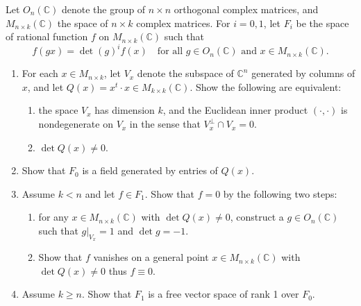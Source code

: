 \begin{exercise}
\label{algebra:2015:2}
Let $O_n(\mathbb{C})$ denote the group of $n \times n$ orthogonal complex matrices, and $M_{n \times k}(\mathbb{C})$ the space of $n \times k$ complex matrices. For $i = 0, 1$, let $F_i$ be the space of rational function $f$ on $M_{n \times k}(\mathbb{C})$ such that
\[
f(gx) = \det(g)^i f(x) \quad \text{for all } g \in O_n(\mathbb{C}) \text{ and } x \in M_{n \times k}(\mathbb{C}).
\]
\begin{enumerate}
    \item For each $x \in M_{n \times k}$, let $V_x$ denote the subspace of $\mathbb{C}^n$ generated by columns of $x$, and let $Q(x) = x^t \cdot x \in M_{k \times k}(\mathbb{C})$. Show the following are equivalent:
    \begin{enumerate}
        \item the space $V_x$ has dimension $k$, and the Euclidean inner product $(\cdot, \cdot)$ is nondegenerate on $V_x$ in the sense that $V_x^\perp \cap V_x = 0$.
        \item $\det Q(x) \neq 0$.
    \end{enumerate}
    \item Show that $F_0$ is a field generated by entries of $Q(x)$.
    \item Assume $k < n$ and let $f \in F_1$. Show that $f = 0$ by the following two steps:
    \begin{enumerate}
        \item for any $x \in M_{n \times k}(\mathbb{C})$ with $\det Q(x) \neq 0$, construct a $g \in O_n(\mathbb{C})$ such that $g|_{V_x} = 1$ and $\det g = -1$.
        \item Show that $f$ vanishes on a general point $x \in M_{n \times k}(\mathbb{C})$ with $\det Q(x) \neq 0$ thus $f \equiv 0$.
    \end{enumerate}
    \item Assume $k \geq n$. Show that $F_1$ is a free vector space of rank 1 over $F_0$.
\end{enumerate}
\end{exercise}

